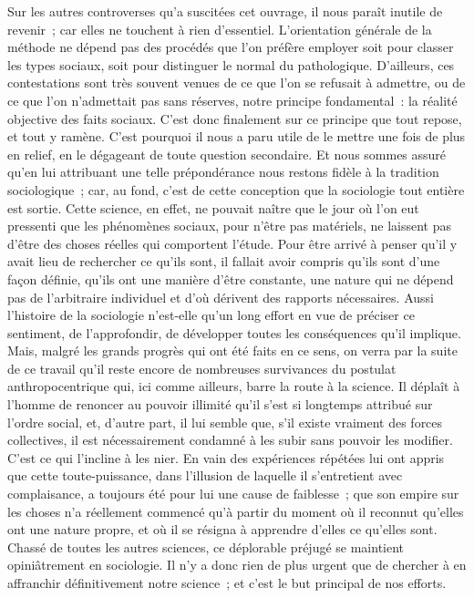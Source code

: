 \documentclass[french,twoside]{book} %
\begin{document}
Sur les autres controverses qu’a suscitées cet ouvrage, il nous paraît inutile de revenir ; car elles ne touchent à rien d’essentiel. L’orientation générale de la méthode ne dépend pas des procédés que l’on préfère employer soit pour classer les types sociaux, soit pour distinguer le normal du pathologique. D’ailleurs, ces contestations sont très souvent venues de ce que l’on se refusait à admettre, ou de ce que l’on n’admettait pas sans réserves, notre principe fondamental : la réalité objective des faits sociaux. C’est donc finalement sur ce principe que tout repose, et tout y ramène. C’est pourquoi il nous a paru utile de le mettre une fois de plus en relief, en le dégageant de toute question secondaire. Et nous sommes assuré qu’en lui attribuant une telle prépondérance nous restons fidèle à la tradition sociologique ; car, au fond, c’est de cette conception que la sociologie tout entière est sortie. Cette science, en effet, ne pouvait naître que le jour où l’on eut pressenti que les phénomènes sociaux, pour n’être pas matériels, ne laissent pas d’être des choses réelles qui comportent l’étude. Pour être arrivé à penser qu’il y avait lieu de rechercher ce qu’ils sont, il fallait avoir compris qu’ils sont d’une façon définie, qu’ils ont une manière d’être constante, une nature qui ne dépend pas de l’arbitraire individuel et d’où dérivent des rapports nécessaires. Aussi l’histoire de la sociologie n’est-elle qu’un long effort en vue de préciser ce sentiment, de l’approfondir, de développer toutes les conséquences qu’il implique. Mais, malgré les grands progrès qui ont été faits en ce sens, on verra par la suite de ce travail qu’il reste encore de nombreuses survivances du postulat anthropocentrique qui, ici comme ailleurs, barre la route à la science. Il déplaît à l’homme de renoncer au pouvoir illimité qu’il s’est si longtemps attribué sur l’ordre social, et, d’autre part, il lui semble que, s’il existe vraiment des forces collectives, il est nécessairement condamné à les subir sans pouvoir les modifier. C’est ce qui l’incline à les nier. En vain des expériences répétées lui ont appris que cette toute-puissance, dans l’illusion de laquelle il s’entretient avec complaisance, a toujours été pour lui une cause de faiblesse ; que son empire sur les choses n’a réellement commencé qu’à partir du moment où il reconnut qu’elles ont une nature propre, et où il se résigna à apprendre d’elles ce qu’elles sont. Chassé de toutes les autres sciences, ce déplorable préjugé se maintient opiniâtrement en sociologie. Il n’y a donc rien de plus urgent que de chercher à en affranchir définitivement notre science ; et c’est le but principal de nos efforts.
\end{document}
